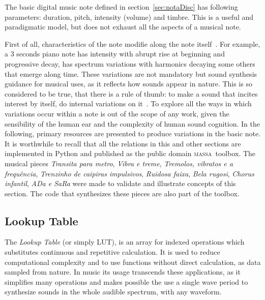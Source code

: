\documentclass[
 aip,
 jmp,
 amsmath,amssymb,
 reprint,
]{revtex4-1}
\newcommand{\massa}{{\large \textsc{massa}}}
\begin{document}
The basic digital music note defined in section~\ref{sec:notaDisc} has following parameters: duration, pitch, intensity (volume) and timbre. This is a useful and paradigmatic model, but does not exhaust all the aspects of a musical note.

First of all, characteristics of the note modifie along the note itself~\cite{Chowning}. For example, a 3 seconds piano note has intensity with abrupt rise at beginning and progressive decay, has spectrum variations with harmonics decaying some others that emerge along time.
These variations are not mandatory but sound synthesis guidance for musical uses, as it reflects how sounds appear in nature. This is so considered to be true, that there is a rule of thumb: to make a sound that incites interest by itself, do internal variations on it~\cite{Roederer}.
To explore all the ways in which variations occur within a note is out of the scope of any work, given the sensibility of the human ear and the complexity of human sound cognition. In the following, primary resources are presented to produce variations in the basic note. It is worthwhile to recall that all the relations in this and other sections are implemented in Python and published as the public domain \massa\ toolbox. The musical pieces \emph{Transita para metro}, \emph{Vibra e treme}, \emph{Tremolos, vibratos e a frequência}, \emph{Trenzinho de caipiras impulsivos}, \emph{Ruidosa faixa}, \emph{Bela rugosi}, \emph{Chorus infantil}, \emph{ADa e SaRa} were made to validate and illustrate concepts of this section. The code that synthesizes these pieces are also part of the toolbox\cite{MASSA}.
 
\subsection{Lookup Table}\label{subsec:lookup}

The \emph{Lookup Table} (or simply LUT), is an array for indexed operations which substitutes continuous and repetitive calculation. It is used to reduce computational complexity and to use functions without direct calculation, as data sampled from nature.
In music its usage transcends these applications, as it simplifies many operations and makes possible the use a single wave period to synthesize sounds in the whole audible spectrum, with any waveform.
\end{document}
